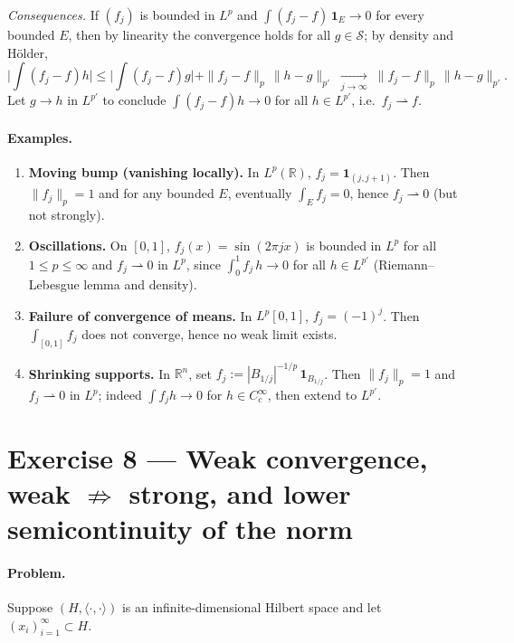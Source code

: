 \documentclass[12pt,a4paper]{article}
\theoremstyle{plain}
\theoremstyle{definition}
\theoremstyle{remark}
\theoremstyle{remark}
\theoremstyle{definition}
\begin{document}
	\medskip
	\noindent\emph{Consequences.}
	If $(f_j)$ is bounded in $L^{p}$ and $\int (f_j-f)\,\mathbf 1_E\to0$ for every bounded $E$,
	then by linearity the convergence holds for all $g\in\mathcal S$; by density and H\"older,
	\[
	\Big|\!\int (f_j-f)h\Big|
	\le \Big|\!\int (f_j-f)g\Big| + \|f_j-f\|_{p}\,\|h-g\|_{p'} \;\xrightarrow[j\to\infty]{}\; \|f_j-f\|_{p}\,\|h-g\|_{p'}.
	\]
	Let $g\to h$ in $L^{p'}$ to conclude $\int (f_j-f)h\to0$ for all $h\in L^{p'}$, i.e.\ $f_j\rightharpoonup f$.
	
	\bigskip
	\paragraph{Examples.}
	\begin{enumerate}
		\item \textbf{Moving bump (vanishing locally).}
		In $L^{p}(\mathbb R)$, $f_j=\mathbf 1_{(j,j+1)}$. Then $\|f_j\|_{p}=1$ and for any bounded $E$,
		eventually $\int_E f_j=0$, hence $f_j\rightharpoonup 0$ (but not strongly).
		
		\item \textbf{Oscillations.}
		On $[0,1]$, $f_j(x)=\sin(2\pi j x)$ is bounded in $L^{p}$ for all $1\le p\le\infty$ and
		$f_j\rightharpoonup 0$ in $L^{p}$, since $\int_0^1 f_j\,h\to0$ for all $h\in L^{p'}$
		(Riemann--Lebesgue lemma and density).
		
		\item \textbf{Failure of convergence of means.}
		In $L^{p}[0,1]$, $f_j=(-1)^j$. Then $\int_{[0,1]} f_j$ does not converge, hence no weak limit exists.
		
		\item \textbf{Shrinking supports.}
		In $\mathbb R^{n}$, set $f_j := |B_{1/j}|^{-1/p}\,\mathbf 1_{B_{1/j}}$. Then $\|f_j\|_p=1$ and
		$f_j\rightharpoonup 0$ in $L^{p}$; indeed $\int f_j h \to 0$ for $h\in C_c^\infty$, then extend to $L^{p'}$.
	\end{enumerate}
	
	\section*{Exercise 8 — Weak convergence, weak $\not\Rightarrow$ strong, and lower semicontinuity of the norm}
	
	\paragraph{Problem.}
	Suppose $(H,\langle\cdot,\cdot\rangle)$ is an infinite-dimensional Hilbert space and
	let $(x_i)_{i=1}^\infty\subset H$.  
	
\end{document}
